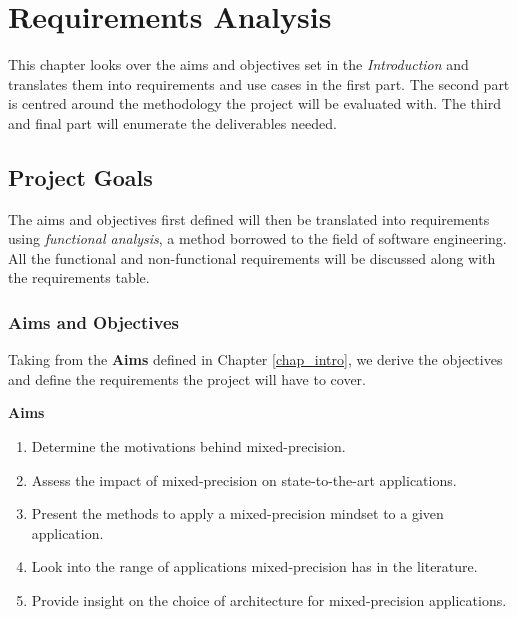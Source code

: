 \chapter{Requirements Analysis} %

\label{Chapter3} %



This chapter looks over the aims and objectives set in the \emph{Introduction} and translates them into requirements and use cases in the first part. The second part is centred around the methodology the project will be evaluated with. The third and final part will enumerate the deliverables needed.

\section{Project Goals}

The aims and objectives first defined will then be translated into requirements using \emph{functional analysis}, a method borrowed to the field of software engineering. All the functional and non-functional requirements will be discussed along with the requirements table.


\subsection{Aims and Objectives}

Taking from the \textbf{Aims} defined in Chapter \ref{chap_intro}, we derive the objectives and define the requirements the project will have to cover.

\textbf{Aims}

\begin{enumerate}
  \item Determine the motivations behind mixed-precision.
  \item Assess the impact of mixed-precision on state-to-the-art applications.
  \item Present the methods to apply a mixed-precision mindset to a given application.
  \item Look into the range of applications mixed-precision has in the literature.
  \item Provide insight on the choice of architecture for mixed-precision applications.
\end{enumerate}

